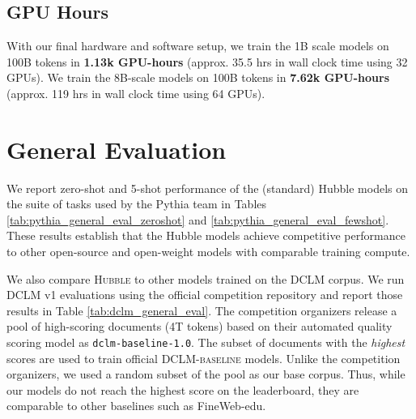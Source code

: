 \documentclass{article} %
\begin{document}
\subsection{GPU Hours}
\label{app:gpu-hour-logging}

With our final hardware and software setup, we train the 1B scale models on 100B tokens in \textbf{1.13k GPU-hours} (approx. 35.5 hrs in wall clock time using 32 GPUs). We train the 8B-scale models on 100B tokens in \textbf{7.62k GPU-hours} (approx. 119 hrs in wall clock time using 64 GPUs).

% 


\newpage
\section{General Evaluation}
\label{app:general_evals}


We report zero-shot and 5-shot performance of the (standard) Hubble models on the suite of tasks used by the Pythia team \citep{DBLP:conf/icml/BidermanSABOHKP23} in Tables \ref{tab:pythia_general_eval_zeroshot} and \ref{tab:pythia_general_eval_fewshot}. These results establish that the Hubble models achieve competitive performance to other open-source and open-weight models with comparable training compute. 

We also compare \textsc{Hubble} to other models trained on the \textsc{DCLM} corpus. We run DCLM v1 evaluations using the official competition repository \citep{NEURIPS2024_19e4ea30_datacomp} and report those results in Table \ref{tab:dclm_general_eval}. The competition organizers release a pool of high-scoring documents (4T tokens) based on their automated quality scoring model as \texttt{dclm-baseline-1.0}. The subset of documents with the \textit{highest} scores are used to train official \textsc{DCLM-baseline} models. Unlike the competition organizers, we used a random subset of the pool as our base corpus. Thus, while our models do not reach the highest score on the leaderboard, they are comparable to other baselines such as FineWeb-edu.
\end{document}
